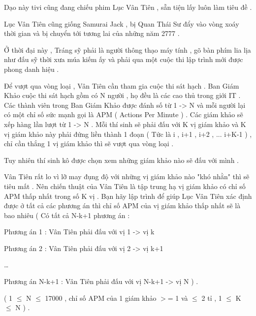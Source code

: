Dạo này tivi cũng đang chiếu phim Lục Vân Tiên , sẵn tiện lấy luôn làm tiêu đề .   


   Lục Vân Tiên cũng giống Samurai Jack , bị Quan Thái Sư đẩy vào vòng xoáy thời gian và bị chuyển tới tương lai của những năm 2777 .   


   Ở thời đại này , Tráng sỹ phải là người thông thạo máy tính , gõ bàn phím lia lịa như đấu sỹ thời xưa múa kiếm ấy và phải qua một cuộc thi lập trình mới được phong danh hiệu .   


   Để vượt qua vòng loại , Vân Tiên cần tham gia cuộc thi sát hạch . Ban Giám Khảo cuộc thi sát hạch gồm có N người , họ đều là các cao thủ trong giới IT . Các thành viên trong Ban Giám Khảo được đánh số từ 1 -> N và mỗi người lại có một chỉ số sức mạnh gọi là APM ( Actions Per Minute ) . Các giám khảo sẽ xếp hàng lần lượt từ 1 -> N . Mỗi thí sinh sẽ phải đấu với K vị giám khảo và K vị giám khảo này phải đứng liền thành 1 đoạn ( Tức là i , i+1 , i+2 , ... i+K-1 ) , chỉ cần thắng 1 vị giám khảo thì sẽ vượt qua vòng loại .   


   Tuy nhiên thí sinh kô được chọn xem những giám khảo nào sẽ đấu với mình .   


   Vân Tiên rất lo vì lỡ may đụng độ với những vị giám khảo nào "khó nhằn" thì sẽ tiêu mất . Nên chiến thuật của Vân Tiên là tập trung hạ vị giám khảo có chỉ số APM thấp nhất trong số K vị . Bạn hãy lập trình để giúp Lục Vân Tiên xác định được ở tất cả các phương án thì chỉ số APM của vị giám khảo thấp nhất sẽ là bao nhiêu ( Có tất cả N-k+1 phương án :   


   Phương án 1 : Vân Tiên phải đấu với vị 1 -> vị k   


   Phương án 2 : Vân Tiên phải đấu với vị 2 -> vị k+1   


   …   


   Phương án N-k+1  : Vân Tiên phải đấu với vị N-k+1 -> vị N ) .   





   ( 1  $\le$  N  $\le$  17000 , chỉ số APM của 1 giám khảo $>$= 1 và  $\le$  2 tỉ , 1  $\le$  K  $\le$  N ) .